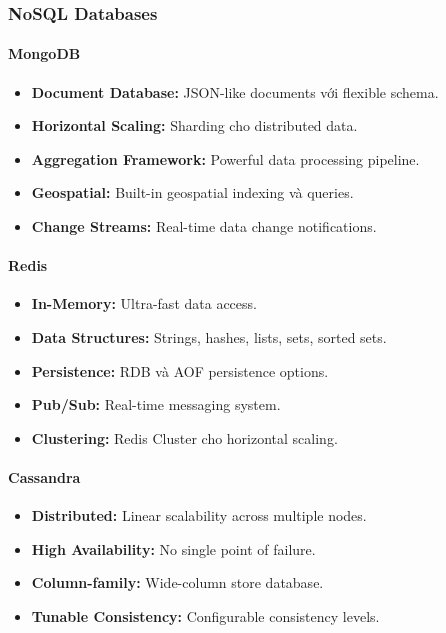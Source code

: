 \documentclass[a4paper,12pt]{report}
\begin{document}
\subsubsection{NoSQL Databases}

\paragraph{MongoDB}
\begin{itemize}
    \item \textbf{Document Database:} JSON-like documents với flexible schema.
    \item \textbf{Horizontal Scaling:} Sharding cho distributed data.
    \item \textbf{Aggregation Framework:} Powerful data processing pipeline.
    \item \textbf{Geospatial:} Built-in geospatial indexing và queries.
    \item \textbf{Change Streams:} Real-time data change notifications.
\end{itemize}

\paragraph{Redis}
\begin{itemize}
    \item \textbf{In-Memory:} Ultra-fast data access.
    \item \textbf{Data Structures:} Strings, hashes, lists, sets, sorted sets.
    \item \textbf{Persistence:} RDB và AOF persistence options.
    \item \textbf{Pub/Sub:} Real-time messaging system.
    \item \textbf{Clustering:} Redis Cluster cho horizontal scaling.
\end{itemize}

\paragraph{Cassandra}
\begin{itemize}
    \item \textbf{Distributed:} Linear scalability across multiple nodes.
    \item \textbf{High Availability:} No single point of failure.
    \item \textbf{Column-family:} Wide-column store database.
    \item \textbf{Tunable Consistency:} Configurable consistency levels.
\end{itemize}
\end{document}
